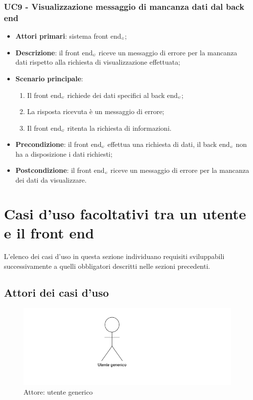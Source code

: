 \subsubsection{UC9 - Visualizzazione messaggio di mancanza dati dal back end}\label{CasiDUsoCasiDUsoTraIlFrontEndEIlBackEndElencoDeiCasiDUsoUC9VisualizzazioneMessaggioDiMancanzaDatiDalBackEnd}
\begin{itemize}
	\item \textbf{Attori primari}: sistema front end$_{\scaleto{G}{3pt}}$;
	\item \textbf{Descrizione}: il front end$_{\scaleto{G}{3pt}}$ riceve un messaggio di errore per la mancanza dati rispetto alla richiesta di visualizzazione effettuata;
	\item \textbf{Scenario principale}:
	\begin{enumerate}
		\item Il front end$_{\scaleto{G}{3pt}}$ richiede dei dati specifici al back end$_{\scaleto{G}{3pt}}$;
		\item La risposta ricevuta è un messaggio di errore;
		\item Il front end$_{\scaleto{G}{3pt}}$ ritenta la richiesta di informazioni.
	\end{enumerate}
	\item \textbf{Precondizione}: il front end$_{\scaleto{G}{3pt}}$ effettua una richiesta di dati, il back end$_{\scaleto{G}{3pt}}$ non ha a disposizione i dati richiesti;
	\item \textbf{Postcondizione}: il front end$_{\scaleto{G}{3pt}}$ riceve un messaggio di errore per la mancanza dei dati da visualizzare.
\end{itemize}

\newpage
\section{Casi d'uso facoltativi tra un utente e il front end}\label{CasiDUsoCasiDUsoFacoltativiTraUnUtenteEIlFrontEnd}
L'elenco dei casi d'uso in questa sezione individuano requisiti sviluppabili successivamente a quelli obbligatori descritti nelle sezioni precedenti.
\subsection{Attori dei casi d'uso}
\begin{center}
	\begin{figure}[H]
		\centering\includegraphics{../immagini/attori_casi/utente_generico.png}
		\caption{Attore: utente generico}
	\end{figure}
\end{center}
